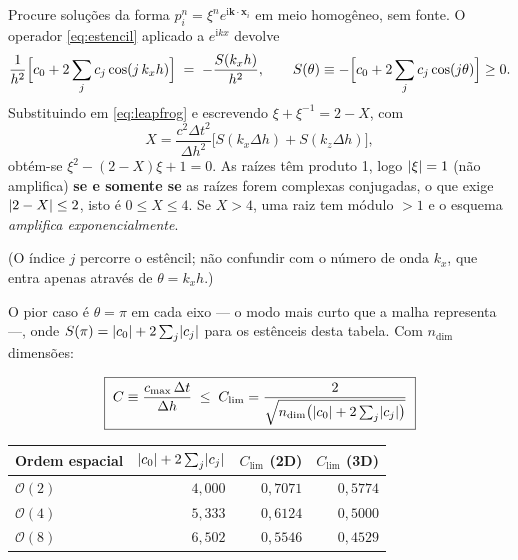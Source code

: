 \documentclass[11pt,a4paper,oneside]{report}
\begin{document}
\begin{derivacao}
Procure solu\c{c}\~oes da forma $p_i^{n} = \xi^{n} e^{\mathrm{i}\mathbf{k}
\cdot\mathbf{x}_i}$ em meio homog\^eneo, sem fonte. O operador
\eqref{eq:estencil} aplicado a $e^{\mathrm{i}kx}$ devolve
\begin{equation}
\frac{1}{h^{2}}\Bigl[c_0 + 2\sum_{j} c_j\cos(j\,k_x h)\Bigr]
 \;=\; -\frac{S(k_x h)}{h^{2}},
\qquad
S(\theta) \equiv -\Bigl[c_0 + 2\sum_{j} c_j\cos(j\theta)\Bigr] \ge 0 .
\end{equation}
Substituindo em \eqref{eq:leapfrog} e escrevendo $\xi + \xi^{-1} = 2 - X$, com
\[
X = \frac{c^{2}\Delta t^{2}}{\Delta h^{2}}
    \bigl[S(k_x\Delta h) + S(k_z\Delta h)\bigr],
\]
obt\'em-se $\xi^{2} - (2-X)\xi + 1 = 0$. As ra\'izes t\^em produto 1, logo
$\lvert \xi \rvert = 1$ (n\~ao amplifica) \textbf{se e somente se} as ra\'izes forem
complexas conjugadas, o que exige $\lvert 2 - X \rvert \le 2$, isto \'e
$0 \le X \le 4$. Se $X > 4$, uma raiz tem m\'odulo $> 1$ e o esquema
\emph{amplifica exponencialmente}.

(O \'indice $j$ percorre o est\^encil; n\~ao confundir com o n\'umero de onda
$k_x$, que entra apenas atrav\'es de $\theta = k_x h$.)

O pior caso \'e $\theta = \pi$ em cada eixo --- o modo mais curto que a malha
representa ---, onde $S(\pi) = \lvert c_0 \rvert + 2\sum_j\lvert c_j \rvert$ para os
est\^enceis desta tabela. Com $n_{\dim}$ dimens\~oes:
\end{derivacao}

\begin{equation}
\boxed{\;
C \equiv \frac{c_{\max}\,\Delta t}{\Delta h} \;\le\; C_{\lim}
 = \frac{2}{\sqrt{n_{\dim}\bigl(\lvert c_0 \rvert + 2\sum_j \lvert c_j \rvert\bigr)}}\;}
\label{eq:cfl}
\end{equation}

\begin{center}
\begin{tabular}{@{}lrrr@{}}
\toprule
\textbf{Ordem espacial} & $\lvert c_0 \rvert+2\sum_j\lvert c_j \rvert$ & $C_{\lim}$ (2D)
& $C_{\lim}$ (3D) \\
\midrule
$\mathcal{O}(2)$ & $4{,}000$ & $0{,}7071$ & $0{,}5774$ \\
$\mathcal{O}(4)$ & $5{,}333$ & $0{,}6124$ & $0{,}5000$ \\
$\mathcal{O}(8)$ & $6{,}502$ & $0{,}5546$ & $0{,}4529$ \\
\bottomrule
\end{tabular}
\end{center}
\end{document}
